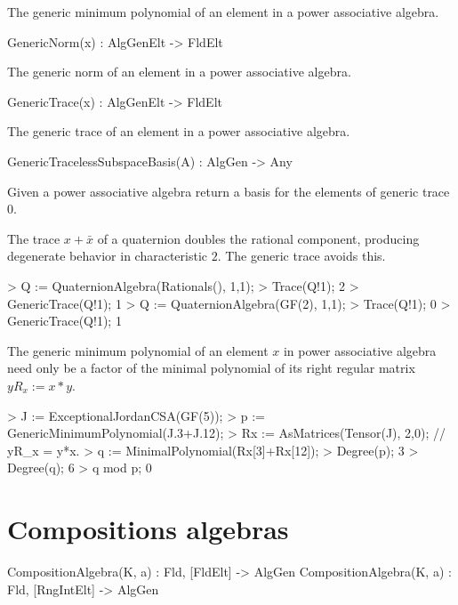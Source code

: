The generic minimum polynomial of an element in a power associative algebra.

\begin{intrinsics}
GenericNorm(x) : AlgGenElt -> FldElt
\end{intrinsics}

The generic norm of an element in a power associative algebra.

\begin{intrinsics}
GenericTrace(x) : AlgGenElt -> FldElt
\end{intrinsics}

The generic trace of an element in a power associative algebra.

\begin{intrinsics}
GenericTracelessSubspaceBasis(A) : AlgGen -> Any
\end{intrinsics}

Given a power associative algebra return a basis for the elements of generic trace 0.

\begin{example}
The trace $x+\bar{x}$ of a quaternion doubles the rational component, producing
degenerate behavior in characteristic $2$.  The generic trace avoids this.

\begin{code}
> Q := QuaternionAlgebra(Rationals(), 1,1);
> Trace(Q!1);        
2
> GenericTrace(Q!1);
1
> Q := QuaternionAlgebra(GF(2), 1,1);  
> Trace(Q!1);
0
> GenericTrace(Q!1);
1
\end{code}

The generic minimum polynomial of an element $x$ in power associative algebra
need only be a factor of the minimal polynomial of its right regular matrix $yR_x:=x*y$.

\begin{code}
> J := ExceptionalJordanCSA(GF(5));
> p := GenericMinimumPolynomial(J.3+J.12);
> Rx := AsMatrices(Tensor(J), 2,0);     // yR_x = y*x.
> q := MinimalPolynomial(Rx[3]+Rx[12]); 
> Degree(p);
3
> Degree(q);
6
> q mod p;
0
\end{code}
\end{example}

\section{Compositions algebras}

\begin{intrinsics}
CompositionAlgebra(K, a) : Fld, [FldElt] -> AlgGen
CompositionAlgebra(K, a) : Fld, [RngIntElt] -> AlgGen
\end{intrinsics}

